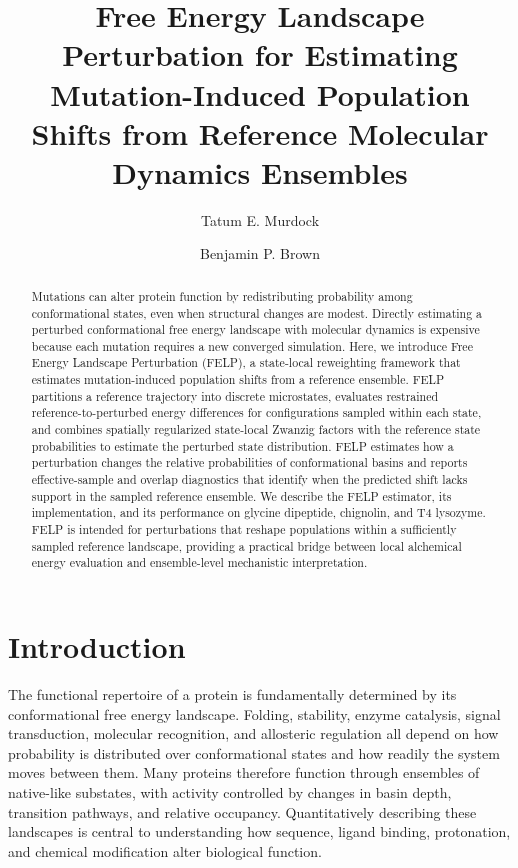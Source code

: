 \documentclass[journal=jctcce,manuscript=article,layout=twocolumn,hyperref=true]{achemso}
\title{Free Energy Landscape Perturbation for Estimating Mutation-Induced Population Shifts from Reference Molecular Dynamics Ensembles}
\author{Tatum E. Murdock}
\affiliation{Chemical and Physical Biology Program, Vanderbilt University, Nashville, Tennessee 37232, United States}
\author{Benjamin P. Brown}
\affiliation{Department of Pharmacology, Vanderbilt University, Nashville, Tennessee 37232, United States}
\begin{document}
\begin{abstract}
		Mutations can alter protein function by redistributing probability among conformational states, even when structural changes are modest. Directly estimating a perturbed conformational free energy landscape with molecular dynamics is expensive because each mutation requires a new converged simulation. Here, we introduce Free Energy Landscape Perturbation (FELP), a state-local reweighting framework that estimates mutation-induced population shifts from a reference ensemble. FELP partitions a reference trajectory into discrete microstates, evaluates restrained reference-to-perturbed energy differences for configurations sampled within each state, and combines spatially regularized state-local Zwanzig factors with the reference state probabilities to estimate the perturbed state distribution. FELP estimates how a perturbation changes the relative probabilities of conformational basins and reports effective-sample and overlap diagnostics that identify when the predicted shift lacks support in the sampled reference ensemble. We describe the FELP estimator, its implementation, and its performance on glycine dipeptide, chignolin, and T4 lysozyme. FELP is intended for perturbations that reshape populations within a sufficiently sampled reference landscape, providing a practical bridge between local alchemical energy evaluation and ensemble-level mechanistic interpretation.
\end{abstract}

	\section{Introduction}

	The functional repertoire of a protein is fundamentally determined by its conformational free energy landscape. Folding, stability, enzyme catalysis, signal transduction, molecular recognition, and allosteric regulation all depend on how probability is distributed over conformational states and how readily the system moves between them. Many proteins therefore function through ensembles of native-like substates, with activity controlled by changes in basin depth, transition pathways, and relative occupancy. Quantitatively describing these landscapes is central to understanding how sequence, ligand binding, protonation, and chemical modification alter biological function.
\end{document}
